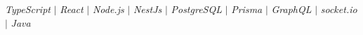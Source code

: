 \emph{TypeScript} $|$ \emph{React} $|$ \emph{Node.js} $|$ \emph{NestJs}
$|$ \emph{PostgreSQL} $|$ \emph{Prisma} $|$ \emph{GraphQL} $|$
\emph{socket.io} $|$ \emph{Java}